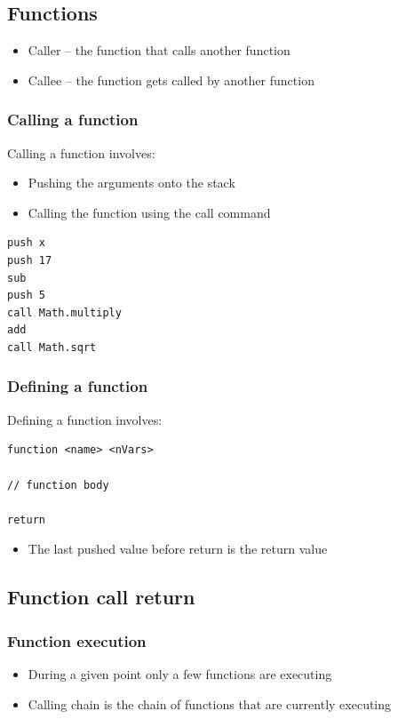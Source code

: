 \documentclass[12pt,a4paper]{article}
\begin{document}
\subsection{Functions}
\begin{itemize}
    \item Caller -- the function that calls another function
    \item Callee -- the function gets called by another function
\end{itemize}
\subsubsection{Calling a function}
Calling a function involves:
\begin{itemize}
    \item Pushing the arguments onto the stack
    \item Calling the function using the call command
\end{itemize}
\begin{verbatim}
push x
push 17
sub
push 5
call Math.multiply 
add
call Math.sqrt
\end{verbatim}

\subsubsection{Defining a function}
Defining a function involves:
\begin{verbatim}
function <name> <nVars>

// function body

return 
\end{verbatim}
\begin{itemize}
    \item The last pushed value before return is the return value
\end{itemize}

\subsection{Function call return}
\subsubsection{Function execution}
\begin{itemize}
    \item During a given point only a few functions are executing 
    \item Calling chain is the chain of functions that are currently executing
\end{itemize}
\end{document}
